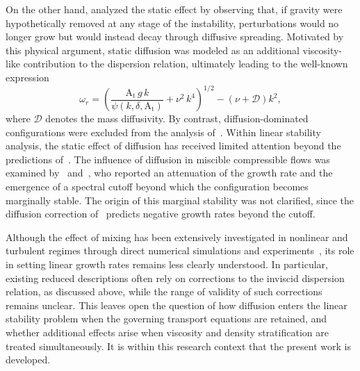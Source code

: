 \documentclass[11pt]{article}
\newcommand{\Atw}{\mathrm{A_t}}
\begin{document}
On the other hand, \citet{duff-harlow-hirt-1962} analyzed the static effect by observing that, if gravity were hypothetically removed at any stage of the instability, perturbations would no longer grow but would instead decay through diffusive spreading. Motivated by this physical argument, static diffusion was modeled as an additional viscosity-like contribution to the dispersion relation, ultimately leading to the well-known expression
\begin{equation}
  \omega_r = \left( \frac{\Atw \, g \,k}{\psi(k,\delta,\Atw)} + \nu^2\,k^{4} \right)^{1/2} - \left( \nu + \mathcal{D} \right) k^2,
\label{eq:duff_static_diffusion}
\end{equation}
where \(\mathcal{D}\) denotes the mass diffusivity. By contrast, diffusion-dominated configurations were excluded from the analysis of~\citet{morgan-likhachev-jacobs-2016}. Within linear stability analysis, the static effect of diffusion has received limited attention beyond the predictions of~\citet{duff-harlow-hirt-1962}. The influence of diffusion in miscible compressible flows was examined by~\citet{lafay-et-al-2007} and~\citet{gauthier-lecruer-2010}, who reported an attenuation of the growth rate and the emergence of a spectral cutoff beyond which the configuration becomes marginally stable. The origin of this marginal stability was not clarified, since the diffusion correction of~\citet{duff-harlow-hirt-1962} predicts negative growth rates beyond the cutoff.

Although the effect of mixing has been extensively investigated in nonlinear and turbulent regimes through direct numerical simulations and experiments~\citep{cook-dimotakis-2001,mueschke-schilling-2009,mueschke-et-al-2009,banerjee-mutnuri-et-al-2012}, its role in setting linear growth rates remains less clearly understood. In particular, existing reduced descriptions often rely on corrections to the inviscid dispersion relation, as discussed above, while the range of validity of such corrections remains unclear. This leaves open the question of how diffusion enters the linear stability problem when the governing transport equations are retained, and whether additional effects arise when viscosity and density stratification are treated simultaneously. It is within this research context that the present work is developed.
\end{document}
